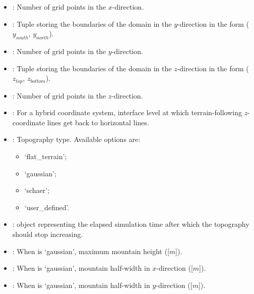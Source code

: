 \documentclass[letterpaper,10pt,english]{sphinxmanual}
\begin{document}
\begin{description}
\begin{itemize}
\item {} 
: Number of grid points in the \(x\)-direction.

\item {} 
: Tuple storing the boundaries of the domain in the                \(y\)-direction in the form (\(y_{south}\), \(y_{north}\)).

\item {} 
: Number of grid points in the \(y\)-direction.

\item {} 
: Tuple storing the boundaries of the domain in the                \(z\)-direction in the form (\(z_{top}\), \(z_{bottom}\)).

\item {} 
: Number of grid points in the \(z\)-direction.

\item {} 
: For a hybrid coordinate system, interface level               at which terrain-following \(z\)-coordinate lines get back to horizontal lines.

\item {} 
: Topography type. Available options are:
\begin{itemize}
\item {} 
‘flat\_terrain’;

\item {} 
‘gaussian’;

\item {} 
‘schaer’;

\item {} 
‘user\_defined’.

\end{itemize}

\item {} 
:  object representing the elapsed             simulation time after which the topography should stop increasing.

\item {} 
: When  is ‘gaussian’,          maximum mountain height ({[}\(m\){]}).

\item {} 
: When  is ‘gaussian’, mountain            half-width in \(x\)-direction ({[}\(m\){]}).

\item {} 
: When  is ‘gaussian’, mountain            half-width in \(y\)-direction ({[}\(m\){]}).


\end{itemize}
\end{description}
\end{document}
